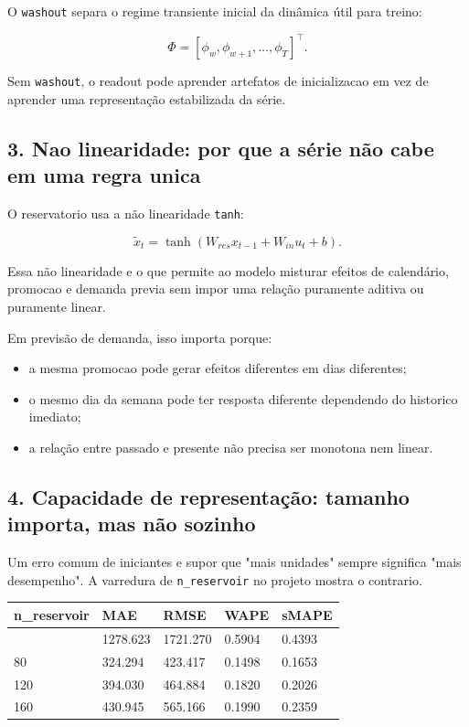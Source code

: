 \documentclass[12pt]{article}
\providecommand{\tightlist}{%
          \setlength{\itemsep}{0pt}\setlength{\parskip}{0pt}}
\begin{document}
O \texttt{washout} separa o regime transiente inicial da dinâmica útil para treino:

\[
\Phi = [\phi_w, \phi_{w+1}, \dots, \phi_T]^\top.
\]

Sem \texttt{washout}, o readout pode aprender artefatos de inicializacao em vez de aprender uma representação estabilizada da série.

\subsection{3. Nao linearidade: por que a série não cabe em uma regra unica}\label{3-nao-linearidade-por-que-a-suxe9rie-nuxe3o-cabe-em-uma-regra-unica}

O reservatorio usa a não linearidade \texttt{tanh}:

\[
\widetilde{x}_t = \tanh(W_{res} x_{t-1} + W_{in} u_t + b).
\]

Essa não linearidade e o que permite ao modelo misturar efeitos de calendário, promocao e demanda previa sem impor uma relação puramente aditiva ou puramente linear.

Em previsão de demanda, isso importa porque:

\begin{itemize}
\tightlist
\item
  a mesma promocao pode gerar efeitos diferentes em dias diferentes;
\item
  o mesmo dia da semana pode ter resposta diferente dependendo do historico imediato;
\item
  a relação entre passado e presente não precisa ser monotona nem linear.
\end{itemize}

\subsection{4. Capacidade de representação: tamanho importa, mas não sozinho}\label{4-capacidade-de-representauxe7uxe3o-tamanho-importa-mas-nuxe3o-sozinho}

Um erro comum de iniciantes e supor que "mais unidades" sempre significa "mais desempenho". A varredura de \texttt{n\_reservoir} no projeto mostra o contrario.

\begin{longtable}[]{@{}lllll@{}}
\toprule\noalign{}
n\_reservoir & MAE & RMSE & WAPE & sMAPE \\
\midrule\noalign{}
\endhead
\bottomrule\noalign{}
\endlastfoot
40 & 1278.623 & 1721.270 & 0.5904 & 0.4393 \\
80 & 324.294 & 423.417 & 0.1498 & 0.1653 \\
120 & 394.030 & 464.884 & 0.1820 & 0.2026 \\
160 & 430.945 & 565.166 & 0.1990 & 0.2359 \\
\end{longtable}
\end{document}
